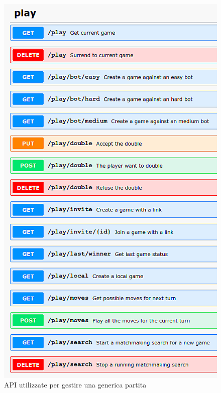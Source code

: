 \documentclass{article}
\begin{document}
\begin{figure}[H]
    \centering
    \begin{minipage}[t]{0.48\textwidth}
        \centering
        \includegraphics[width=\textwidth]{report-sw_overview}
        \caption{API utilizzate per gestire una generica partita}
        \label{fig:sw_overview}
    \end{minipage}
    \hfill
    \begin{minipage}[t]{0.49\textwidth}
        \centering

\end{minipage}
\end{figure}
\end{document}
